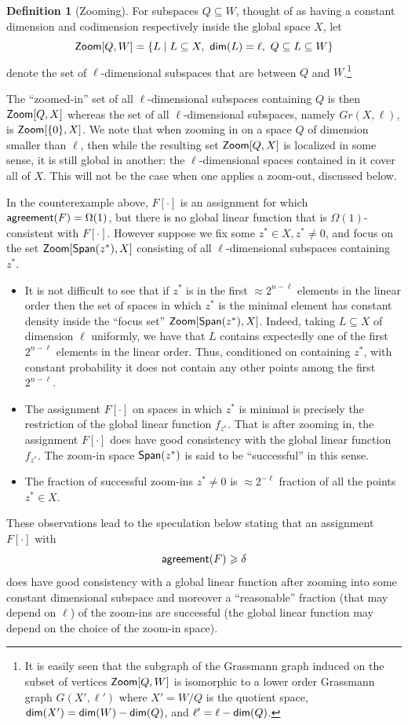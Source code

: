 \documentclass[11pt]{article}
\numberwithin{equation}{section}
\theoremstyle{definition}
\newtheorem{definition}[theorem]{Definition}
\theoremstyle{plain}
\renewcommand\ge{\geqslant}
\newcommand{\Zoom}{{\sf Zoom}}
\def\agr{{\sf agreement}}
\begin{document}
\begin{definition}[Zooming]
For subspaces
$Q \subseteq W$, thought of as having a constant dimension and
codimension respectively inside the global space $X$, let
$$ {\Zoom}[Q, W] = \{ L \mid L \subseteq X, ~{\sf dim}(L) = \ell, ~Q \subseteq L \subseteq W\}$$
denote the set of $\ell$-dimensional subspaces that are between $Q$
and $W$.\footnote{It is easily seen that the subgraph of the Grassmann
  graph induced on the subset of vertices ${\Zoom}[Q, W]$ is
  isomorphic to a lower order Grassmann graph $G(X', \ell')$ where
  $X' = W/Q$ is the quotient space,
  ${\sf dim}(X')= {\sf dim}(W)-{\sf dim}(Q)$, and
  $\ell' = \ell - {\sf dim}(Q)$.}
\end{definition}
 The ``zoomed-in'' set of all
$\ell$-dimensional subspaces containing $Q$ is then ${\Zoom}[Q, X]$
whereas the set of all $\ell$-dimensional subspaces, namely  $Gr(X,\ell)$,
is ${\Zoom}[\{0\}, X]$. We note that when zooming in on a space $Q$
of dimension smaller than $\ell$, then while the resulting set
${\Zoom}[Q, X]$ is localized in some sense, it is still global in
another: the $\ell$-dimensional spaces contained in it cover all of
$X$. This will not be the case when one applies a zoom-out, discussed
below.

\smallskip
In the counterexample above, $F[\cdot]$ is an assignment for which $\agr(F)=\Omega(1)$, but there is no global
linear function that is $\Omega(1)$-consistent with $F[\cdot]$. However suppose we fix some $z^* \in X, z^* \not= 0$, and
focus on the set ${\Zoom}[ {\sf Span}(z^*), X]$ consisting of all $\ell$-dimensional subspaces containing $z^*$.
\begin{itemize}
\item It is not difficult to see that if $z^*$ is in the first $\approx 2^{n-\ell}$ elements in the linear order then the set of spaces in which $z^*$ is the minimal element has constant density inside the ``focus set''
 ${\Zoom}[{\sf Span}(z^*), X]$. Indeed, taking $L\subseteq X$ of dimension $\ell$ uniformly, we have that $L$ contains expectedly
 one of the first $2^{n-\ell}$ elements in the linear order. Thus, conditioned on containing $z^{*}$,
 with constant probability it does not contain any other points among the first $2^{n-\ell}$.
 \item The assignment $F[\cdot]$ on spaces in which $z^*$ is minimal
   is precisely the restriction of the global linear function
   $f_{z^*}$.  That is  after zooming in, the assignment $F[\cdot]$ does have good consistency with the global linear function $f_{z^*}$. The zoom-in space ${\sf Span}(z^*)$ is said to be
  ``successful'' in this sense.
 \item The fraction of successful zoom-ins $z^*\neq 0$ is $\approx 2^{-\ell}$ fraction of all the points $z^*\in X$.
\end{itemize}
These observations lead to the speculation below stating that an assignment $F[\cdot]$ with
%
%
%
\[ \agr(F)\ge\delta  \]   %
does have good consistency with
a global linear function after zooming into some constant dimensional subspace and moreover a ``reasonable'' fraction (that may depend on $\ell$)
of the zoom-ins are successful  (the global linear function may depend on the choice of the zoom-in space).
\end{document}
